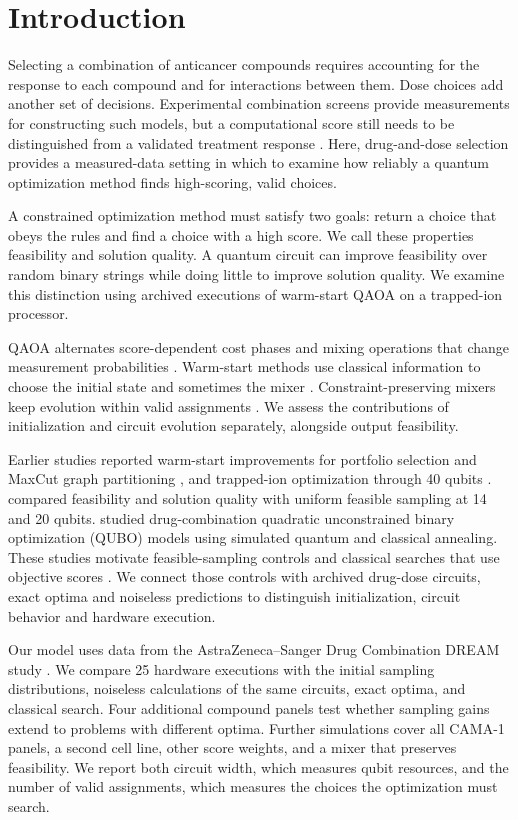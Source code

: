 \documentclass[utf8]{FrontiersinHarvard}
\begin{document}
\section{Introduction}
Selecting a combination of anticancer compounds requires accounting for the response to each compound and for interactions between them. Dose choices add another set of decisions. Experimental combination screens provide measurements for constructing such models, but a computational score still needs to be distinguished from a validated treatment response \citep{menden2019}. Here, drug-and-dose selection provides a measured-data setting in which to examine how reliably a quantum optimization method finds high-scoring, valid choices.

A constrained optimization method must satisfy two goals: return a choice that obeys the rules and find a choice with a high score. We call these properties feasibility and solution quality. A quantum circuit can improve feasibility over random binary strings while doing little to improve solution quality. We examine this distinction using archived executions of warm-start QAOA on a trapped-ion processor.

QAOA alternates score-dependent cost phases and mixing operations that change measurement probabilities \citep{farhi2014}. Warm-start methods use classical information to choose the initial state and sometimes the mixer \citep{egger2021}. Constraint-preserving mixers keep evolution within valid assignments \citep{hadfield2019}. We assess the contributions of initialization and circuit evolution separately, alongside output feasibility.

Earlier studies reported warm-start improvements for portfolio selection and MaxCut graph partitioning \citep{egger2021}, and trapped-ion optimization through 40 qubits \citep{pagano2020}. \citet{niroula2022} compared feasibility and solution quality with uniform feasible sampling at 14 and 20 qubits. \citet{ramos2026} studied drug-combination quadratic unconstrained binary optimization (QUBO) models using simulated quantum and classical annealing. These studies motivate feasible-sampling controls and classical searches that use objective scores \citep{koch2026,sankar2024}. We connect those controls with archived drug-dose circuits, exact optima and noiseless predictions to distinguish initialization, circuit behavior and hardware execution.

Our model uses data from the AstraZeneca--Sanger Drug Combination DREAM study \citep{menden2019}. We compare 25 hardware executions with the initial sampling distributions, noiseless calculations of the same circuits, exact optima, and classical search. Four additional compound panels test whether sampling gains extend to problems with different optima. Further simulations cover all CAMA-1 panels, a second cell line, other score weights, and a mixer that preserves feasibility. We report both circuit width, which measures qubit resources, and the number of valid assignments, which measures the choices the optimization must search.
\end{document}

